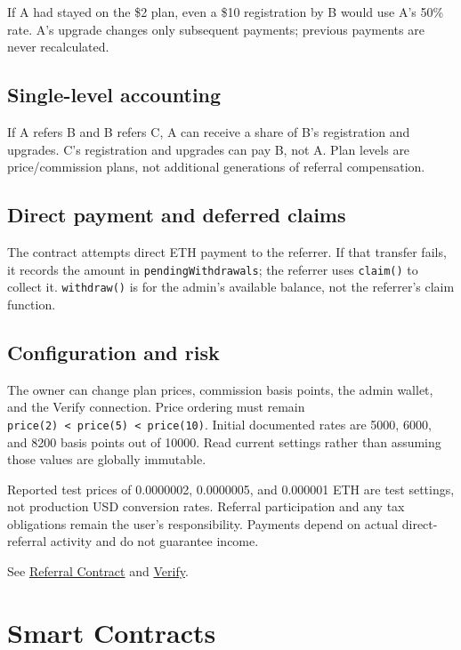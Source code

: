 \documentclass[
  10pt,
  letterpaper,
]{article}
\begin{document}
If A had stayed on the \$2 plan, even a \$10 registration by B would use
A's 50\% rate. A's upgrade changes only subsequent payments; previous
payments are never recalculated.

\subsection{Single-level accounting}\label{single-level-accounting}

If A refers B and B refers C, A can receive a share of B's registration
and upgrades. C's registration and upgrades can pay B, not A. Plan
levels are price/commission plans, not additional generations of
referral compensation.

\subsection{Direct payment and deferred
claims}\label{direct-payment-and-deferred-claims}

The contract attempts direct ETH payment to the referrer. If that
transfer fails, it records the amount in \texttt{pendingWithdrawals};
the referrer uses \texttt{claim()} to collect it. \texttt{withdraw()} is
for the admin's available balance, not the referrer's claim function.

\subsection{Configuration and risk}\label{configuration-and-risk}

The owner can change plan prices, commission basis points, the admin
wallet, and the Verify connection. Price ordering must remain
\texttt{price(2)\ \textless{}\ price(5)\ \textless{}\ price(10)}.
Initial documented rates are 5000, 6000, and 8200 basis points out of
10000. Read current settings rather than assuming those values are
globally immutable.

Reported test prices of 0.0000002, 0.0000005, and 0.000001 ETH are test
settings, not production USD conversion rates. Referral participation
and any tax obligations remain the user's responsibility. Payments
depend on actual direct-referral activity and do not guarantee income.

See
\href{https://fos.ooo/document/docs/technical/referral-contract}{Referral
Contract} and
\href{https://fos.ooo/document/docs/technical/verification-contract}{Verify}.

\section{Smart Contracts}\label{smart-contracts}
\end{document}
